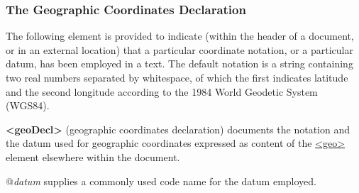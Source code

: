 \subsubsection[{The Geographic Coordinates Declaration}]{The Geographic Coordinates Declaration}\label{HDGDECL}\par
The following element is provided to indicate (within the header of a document, or in an external location) that a particular coordinate notation, or a particular datum, has been employed in a text. The default notation is a string containing two real numbers separated by whitespace, of which the first indicates latitude and the second longitude according to the 1984 World Geodetic System (WGS84). 
\begin{sansreflist}
  
\item [\textbf{<geoDecl>}] (geographic coordinates declaration) documents the notation and the datum used for geographic coordinates expressed as content of the \hyperref[TEI.geo]{<geo>} element elsewhere within the document.\hfil\\[-10pt]\begin{sansreflist}
    \item[@{\itshape datum}]
  supplies a commonly used code name for the datum employed.
\end{sansreflist}  
\end{sansreflist}

